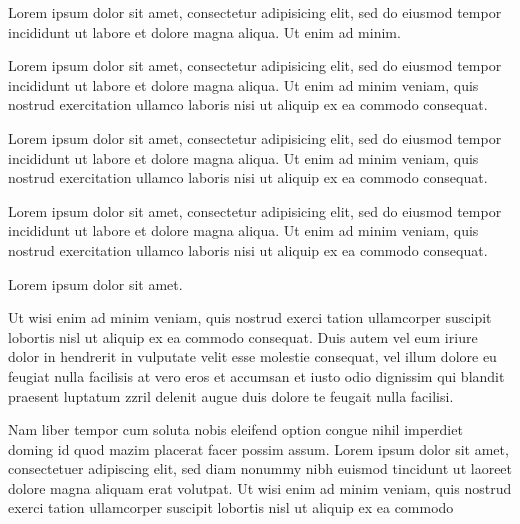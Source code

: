 \documentclass{article}
\begin{document}
{}

Lorem ipsum dolor sit amet, consectetur adipisicing elit, sed do eiusmod
tempor incididunt ut labore et dolore magna aliqua. Ut enim ad minim.

\begin{clozepar}
Lorem ipsum dolor sit amet, consectetur adipisicing elit, sed do eiusmod
tempor incididunt ut labore et dolore magna aliqua. Ut enim ad minim
veniam, quis nostrud exercitation ullamco laboris nisi ut aliquip ex ea
commodo consequat.
\end{clozepar}



\begin{clozepar}
Lorem ipsum dolor sit amet, consectetur adipisicing elit, sed do eiusmod
tempor incididunt ut labore et dolore magna aliqua. Ut enim ad minim
veniam, quis nostrud exercitation ullamco laboris nisi ut aliquip ex ea
commodo consequat.
\end{clozepar}



\begin{clozepar}
Lorem ipsum dolor sit amet, consectetur adipisicing elit, sed do eiusmod
tempor incididunt ut labore et dolore magna aliqua. Ut enim ad minim
veniam, quis nostrud exercitation ullamco laboris nisi ut aliquip ex ea
commodo consequat.
\end{clozepar}

Lorem ipsum dolor sit amet.

\begin{clozepar}
Ut wisi enim ad minim veniam, quis nostrud exerci tation ullamcorper
suscipit lobortis nisl ut aliquip ex ea commodo consequat. Duis autem
vel eum iriure dolor in hendrerit in vulputate velit esse molestie
consequat, vel illum dolore eu feugiat nulla facilisis at vero eros et
accumsan et iusto odio dignissim qui blandit praesent luptatum zzril
delenit augue duis dolore te feugait nulla facilisi.

Nam liber tempor cum soluta nobis eleifend option congue nihil imperdiet
doming id quod mazim placerat facer possim assum. Lorem ipsum dolor sit
amet, consectetuer adipiscing elit, sed diam nonummy nibh euismod
tincidunt ut laoreet dolore magna aliquam erat volutpat. Ut wisi enim ad
minim veniam, quis nostrud exerci tation ullamcorper suscipit lobortis
nisl ut aliquip ex ea commodo
\end{clozepar}
\end{document}
